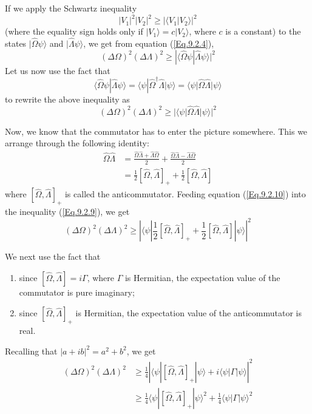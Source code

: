 If we apply the Schwartz inequality
\begin{equation}
	|V_1|^2|V_2|^2 \geq \left|\langle V_1|V_2\rangle\right|^2
\end{equation}
(where the equality sign holds only if $|V_1\rangle = c|V_2\rangle$, where $c$ is a constant) to the states $|\hat{\Omega}\psi\rangle$ and $|\hat{\Lambda}\psi\rangle$, we get from equation (\ref{Eq.9.2.4}),	
\begin{equation}
	(\Delta\Omega)^2(\Delta\Lambda)^2 \geq |\langle\hat{\Omega}\psi|\hat{\Lambda}\psi\rangle|^2
\end{equation}
Let us now use the fact that
\begin{equation}
	\langle\hat{\Omega}\psi|\hat{\Lambda}\psi\rangle = \langle\psi|\hat{\Omega}^{\dagger}\hat{\Lambda}|\psi\rangle = \langle\psi|\hat{\Omega}\hat{\Lambda}|\psi\rangle
\end{equation}
to rewrite the above inequality as
\begin{equation}
	(\Delta\Omega)^2(\Delta\Lambda)^2 \geq |\langle\psi|\hat{\Omega}\hat{\Lambda}|\psi\rangle|^2 \label{Eq.9.2.9}
\end{equation}

Now, we know that the commutator has to enter the picture somewhere. This we arrange through the following identity:
\begin{align}
	\hat{\Omega}\hat{\Lambda} &= \frac{\hat{\Omega}\hat{\Lambda} + \hat{\Lambda}\hat{\Omega}}{2} + \frac{\hat{\Omega}\hat{\Lambda} - \hat{\Lambda}\hat{\Omega}}{2} \nonumber \\
	&= \frac{1}{2}[\hat{\Omega},\hat{\Lambda}]_{+} + \frac{1}{2}[\hat{\Omega},\hat{\Lambda}]\label{Eq.9.2.10}
\end{align}
where $[\hat{\Omega},\hat{\Lambda}]_{+}$ is called the anticommutator. Feeding equation (\ref{Eq.9.2.10}) into the inequality (\ref{Eq.9.2.9}), we get
\begin{equation}
	(\Delta\Omega)^{2}(\Delta\Lambda)^{2} \geq \left|\langle\psi|\frac{1}{2}[\hat{\Omega},\hat{\Lambda}]_{+} + \frac{1}{2}[\hat{\Omega},\hat{\Lambda}]|\psi\rangle\right|^{2}
\end{equation}

We next use the fact that
\begin{enumerate}
	\item since $[\hat{\Omega},\hat{\Lambda}] = i\Gamma$, where $\Gamma$ is Hermitian, the expectation value of the commutator is pure imaginary;
	\item since $[\hat{\Omega},\hat{\Lambda}]_{+}$ is Hermitian, the expectation value of the anticommutator is real.
\end{enumerate}
Recalling that $|a+ib|^{2} = a^{2} + b^{2}$, we get
\begin{align}
	(\Delta\Omega)^{2}(\Delta\Lambda)^{2} &\geq \frac{1}{4}\left|\langle\psi|[\hat{\Omega},\hat{\Lambda}]_{+}|\psi\rangle + i\langle\psi|\Gamma|\psi\rangle\right|^{2} \nonumber \\
	&\geq \frac{1}{4}\langle\psi|[\hat{\Omega},\hat{\Lambda}]_{+}|\psi\rangle^{2} + \frac{1}{4}\langle\psi|\Gamma|\psi\rangle^{2}
\end{align}

